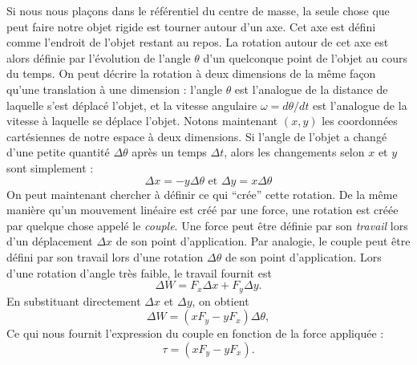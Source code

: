 Si nous nous plaçons dans le référentiel du centre de masse, la seule chose que peut faire notre objet rigide est tourner autour d'un axe. Cet axe est défini comme l'endroit de l'objet restant au repos. La rotation autour de cet axe est alors définie par l'évolution de l'angle $\theta$ d'un quelconque point de l'objet au cours du temps. On peut décrire la rotation à deux dimensions de la même façon qu'une translation à une dimension : l'angle $\theta$ est l'analogue de la distance de laquelle s'est déplacé l'objet, et la vitesse angulaire $\omega=d\theta/dt$ est l'analogue de la vitesse à laquelle se déplace l'objet. Notons maintenant $(x,y)$ les coordonnées cartésiennes de notre espace à deux dimensions. Si l'angle de l'objet a changé d'une petite quantité $\Delta\theta$ après un temps $\Delta t$, alors les changements selon $x$ et $y$ sont simplement :
\begin{equation*}
\Delta x = -y\Delta \theta \mbox{ et } \Delta y = x\Delta \theta
\end{equation*}
On peut maintenant chercher à définir ce qui ``crée'' cette rotation. De la même manière qu'un mouvement linéaire est créé par une force, une rotation est créée par quelque chose appelé le \textit{couple}. Une force peut être définie par son \textit{travail} lors d'un déplacement $\Delta x$ de son point d'application. Par analogie, le couple peut être défini par son travail lors d'une rotation $\Delta \theta$ de son point d'application. Lors d'une rotation d'angle très faible, le travail fournit est 
\begin{equation*}
\Delta W = F_x \Delta x + F_y \Delta y.
\end{equation*}
En substituant directement $\Delta x$ et $\Delta y$, on obtient
\begin{equation*}
\Delta W = (xF_y-yF_x)\Delta \theta,
\end{equation*}
Ce qui nous fournit l'expression du couple en fonction de la force appliquée :
\begin{equation*}
\tau = (xF_y-yF_x).
\end{equation*}

